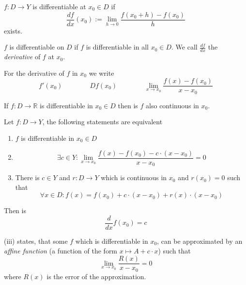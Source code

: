 \begin{definition}
   \(f: D \to Y\) is differentiable at \(x_0 \in D\) if
   \[\frac{df}{dx}(x_0) := \lim_{h \to 0} \frac{f(x_0 + h) - f(x_0)}{h}\]
   exists.
\end{definition}
\begin{remark}[Terminology]
   \(f\) is differentiable on \(D\) if \(f\) is differentiable in all \(x_0 \in D\).
   We call \(\frac{df}{dx}\) the \emph{derivative} of \(f\) at \(x_0\).
\end{remark}
\begin{remark}[Notation]
   For the derivative of \(f\) in \(x_0\) we write
   \[f'(x_0) \qquad\qquad Df(x_0) \qquad\qquad \lim_{x \to x_0} \frac{f(x) - f(x_0)}{x - x_0}\]
\end{remark}

\begin{proposition}\label{pro:deri_impl_cont}
   If \(f: D \to \mathbb{R}\) is differentiable in \(x_0 \in D\) then is \(f\) also continuous in \(x_0\).
\end{proposition}

\begin{proposition}
   Let \(f: D \to Y\), the following statements are equivalent
   \begin{enumerate}[label=\roman*, align=Center]
      \item \(f\) is differentiable in \(x_0 \in D\)
      \item
         \[\exists c \in Y: \lim_{x \to x_0} \frac{f(x) - f(x_0) - c \cdot (x - x_0)}{x - x_0} = 0\]
      \item There is \(c \in Y\) and \(r: D \to Y\) which is continuous in \(x_0\) and \(r(x_0) = 0\) such that
         \[\forall x \in D: f(x) = f(x_0) + c \cdot (x - x_0) + r(x) \cdot (x - x_0)\]
   \end{enumerate}
   Then is
   \[\frac{d}{dx}f(x_0) = c\]
\end{proposition}
\begin{remark}[Intuition]
   (iii) states, that some \(f\) which is differentiable in \(x_0\), can be approximated by an \emph{affine function} (a function of the form \(x \mapsto A + c \cdot x\)) such that
   \[\lim_{x \to x_0} \frac{R(x)}{x - x_0} = 0\]
   where \(R(x)\) is the error of the approximation.
\end{remark}
